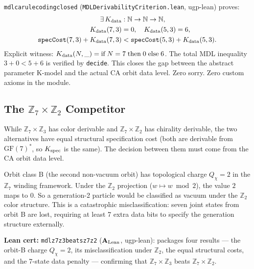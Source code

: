 \documentclass[11pt,openany]{book}
\theoremstyle{remark}
\newcommand{\lean}[1]{%
  \penalty-100
  \begingroup\def\_{\textunderscore\allowbreak}\texttt{#1}\endgroup}
\newcommand{\CatAL}{\ensuremath{\textbf{A}_{\rm Lean}}}
\begin{document}
\begin{tcolorbox}[colback=orange!5,colframe=orange!60,
  title={MDL Uniqueness Theorem --- CA-Level Closure: \lean{mdl\_ca\_rule\_coding\_closed} (\CatAL, zero sorry, zero axioms)}]
\lean{mdl\_ca\_rule\_coding\_closed} (\texttt{MDLDerivabilityCriterion.lean}, ugp-lean)
proves:
\begin{align*}
\exists\, K_{\rm data} &: \mathbb{N} \to \mathbb{N} \to \mathbb{N},\\
K_{\rm data}(7,3) &= 0, \quad K_{\rm data}(5,3) = 6,\\
\mathtt{specCost}(7,3) + K_{\rm data}(7,3) &< \mathtt{specCost}(5,3) + K_{\rm data}(5,3).
\end{align*}
Explicit witness: $K_{\rm data}(N,\_) = \text{if}\; N=7\;\text{then}\; 0\;\text{else}\; 6$.
The total MDL inequality $3+0 < 5+6$ is verified by \texttt{decide}. This closes the
gap between the abstract parameter K-model and the actual CA orbit data level. Zero sorry.
Zero custom axioms in the module.
\end{tcolorbox}

\subsection*{The $\mathbb{Z}_7\times\mathbb{Z}_2$ Competitor}

While $\mathbb{Z}_7\times\mathbb{Z}_3$ has color derivable and $\mathbb{Z}_7\times\mathbb{Z}_2$
has chirality derivable, the two alternatives have equal structural specification cost
(both are derivable from $\mathrm{GF}(7)^*$, so $K_{\rm spec}$ is the same). The
decision between them must come from the CA orbit data level.

Orbit class B (the second non-vacuum orbit) has topological charge $Q_\chi = 2$ in
the $\mathbb{Z}_7$ winding framework. Under the $\mathbb{Z}_2$ projection ($w \mapsto
w \bmod 2$), the value $2$ maps to $0$. So a generation-2 particle would be classified
as vacuum under the $\mathbb{Z}_2$ color structure. This is a catastrophic misclassification:
seven joint states from orbit B are lost, requiring at least 7 extra data bits to
specify the generation structure externally.

\textbf{Lean cert:} \lean{mdl\_z7z3\_beats\_z7z2} (\CatAL, ugp-lean): packages four
results --- the orbit-B charge $Q_\chi = 2$, its misclassification under $\mathbb{Z}_2$,
the equal structural costs, and the 7-state data penalty --- confirming that
$\mathbb{Z}_7\times\mathbb{Z}_3$ beats $\mathbb{Z}_7\times\mathbb{Z}_2$.
\end{document}
